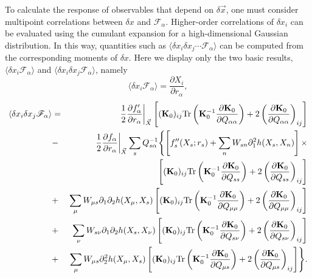 To calculate the response of observables that depend on $\delta \vec{x}$, one must consider multipoint correlations between $\delta x$ and $\mathscr{F}_{\alpha}$. Higher-order correlations of $\delta x_i$ can be evaluated using the cumulant expansion for a high-dimensional Gaussian distribution. In this way, quantities such as $\langle \delta x_i \delta x_j \cdots \mathscr{F}_{\alpha}\rangle$ can be computed from the corresponding moments of $\delta x$. Here we display only the two basic results, $\langle \delta x_i\mathscr{F}_\alpha\rangle$ and $\langle \delta x_i \delta x_j{\mathscr F}_\alpha\rangle$, namely
\begin{equation}
    \langle \delta x_i \mathscr{F}_{\alpha}\rangle = \frac{\partial X_i}{\partial r_\alpha},
    \label{dxdr}
\end{equation}
\begin{eqnarray}
\langle \delta x_i \delta x_j{\mathscr F}_\alpha\rangle&=& \frac{1}{2}\frac{\partial f'_\alpha}{\partial r_\alpha}\bigg|_{\vec X}\left[ ({\bf K}_0)_{ij}\text{Tr}\left({\bf K}^{-1}_0\frac{\partial {\bf K}_0}{\partial Q_{\alpha \alpha}} \right)+2 \left(\frac{\partial {\bf K}_0}{\partial Q_{\alpha \alpha}}\right)_{ij} \right]\label{dxdxscrF}\\
&-&\frac{1}{2} \frac{\partial f_\alpha}{\partial r_\alpha}\bigg|_{\vec X} \sum_s Q_{s\alpha}^{-1}\Biggl\{ \left[ f_s''(X_s;r_s)+  \sum_n W_{sn}\partial_1^2h(X_s,X_n)\right] \times\nonumber\\
& &\left[ ({\bf K}_0)_{ij} \text{Tr}\left({\bf K}^{-1}_0\frac{\partial {\bf K}_0}{\partial Q_{ss}}\right)+2 \left(\frac{\partial {\bf K}_0}{\partial Q_{ss}} \right)_{ij}\right] \nonumber\\
&+&\sum_\mu W_{\mu s}\partial_1\partial_2h(X_\mu,X_s) \left[ ({\bf K}_0)_{ij} \text{Tr} \left({\bf K}_0^{-1}\frac{\partial {\bf K}_0}{\partial Q_{\mu\mu}} \right)+2 \left(\frac{\partial {\bf K}_0}{\partial Q_{\mu\mu}} \right)_{ij}\right] \nonumber\\
&+& \sum_\nu W_{s\nu} \partial_1\partial_2h(X_s,X_\nu)  \left[ ({\bf K}_0)_{ij}\text{Tr} \left({\bf K}_0^{-1}\frac{\partial {\bf K}_0}{\partial Q_{s\nu}} \right)+2 \left(\frac{\partial {\bf K}_0}{\partial Q_{s\nu}} \right)_{ij}\right]    \nonumber\\
& +&\sum_\mu W_{\mu s}  \partial_2^2 h(X_\mu,X_s)\left[ ({\bf K}_0)_{ij} \text{Tr} \left({\bf K}_0^{-1} \frac{\partial {\bf K}_0}{\partial Q_{\mu s}} \right)+2 \left(\frac{\partial {\bf K}_0}{\partial Q_{\mu s}} \right)_{ij}\right]\Biggr\}.\nonumber
\end{eqnarray}
